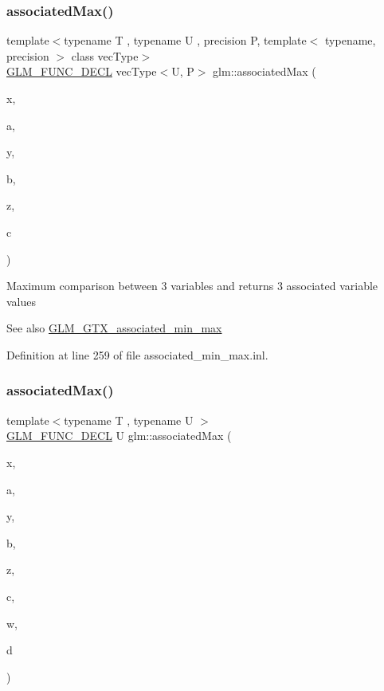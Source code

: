 \subsubsection{\texorpdfstring{associatedMax()}{associatedMax()}\hspace{0.1cm}{\footnotesize\ttfamily [8/12]}}
{\footnotesize\ttfamily template$<$typename T , typename U , precision P, template$<$ typename, precision $>$ class vec\+Type$>$ \\
\mbox{\hyperlink{setup_8hpp_ab2d052de21a70539923e9bcbf6e83a51}{G\+L\+M\+\_\+\+F\+U\+N\+C\+\_\+\+D\+E\+CL}} vec\+Type$<$U, P$>$ glm\+::associated\+Max (\begin{DoxyParamCaption}\item[{vec\+Type$<$ T, P $>$ const \&}]{x,  }\item[{U}]{a,  }\item[{vec\+Type$<$ T, P $>$ const \&}]{y,  }\item[{U}]{b,  }\item[{vec\+Type$<$ T, P $>$ const \&}]{z,  }\item[{U}]{c }\end{DoxyParamCaption})}

Maximum comparison between 3 variables and returns 3 associated variable values \begin{DoxySeeAlso}{See also}
\mbox{\hyperlink{group__gtx__associated__min__max}{G\+L\+M\+\_\+\+G\+T\+X\+\_\+associated\+\_\+min\+\_\+max}} 
\end{DoxySeeAlso}


Definition at line 259 of file associated\+\_\+min\+\_\+max.\+inl.

\mbox{\label{group__gtx__associated__min__max_ga3038ffcb43eaa6af75897a99a5047ccc}} 
\subsubsection{\texorpdfstring{associatedMax()}{associatedMax()}\hspace{0.1cm}{\footnotesize\ttfamily [9/12]}}
{\footnotesize\ttfamily template$<$typename T , typename U $>$ \\
\mbox{\hyperlink{setup_8hpp_ab2d052de21a70539923e9bcbf6e83a51}{G\+L\+M\+\_\+\+F\+U\+N\+C\+\_\+\+D\+E\+CL}} U glm\+::associated\+Max (\begin{DoxyParamCaption}\item[{T}]{x,  }\item[{U}]{a,  }\item[{T}]{y,  }\item[{U}]{b,  }\item[{T}]{z,  }\item[{U}]{c,  }\item[{T}]{w,  }\item[{U}]{d }\end{DoxyParamCaption})}

